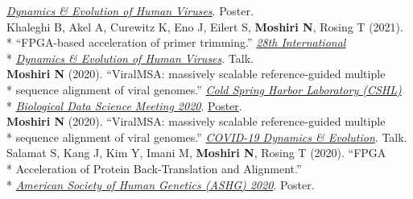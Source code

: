 \documentclass[margin,line]{res}
\begin{document}
\begin{resume}
\hspace*{8mm} \href{https://cpd.ucsd.edu/hivdynamics/}{\textit{Dynamics \& Evolution of Human Viruses}}. Poster.\\
\hspace*{4mm} Khaleghi B, Akel A, Curewitz K, Eno J, Eilert S, \textbf{Moshiri N}, Rosing T (2021).\\*
\hspace*{9mm} ``FPGA-based acceleration of primer trimming.'' \href{https://cpd.ucsd.edu/hivdynamics/}{\textit{28th International}}\\*\vspace{2mm}
\hspace*{8mm} \href{https://cpd.ucsd.edu/hivdynamics/}{\textit{Dynamics \& Evolution of Human Viruses}}. Talk.\\
\hspace*{4mm} \textbf{Moshiri N} (2020). ``ViralMSA: massively scalable reference-guided multiple\\*
\hspace*{9mm} sequence alignment of viral genomes.'' \href{http://meetings.cshl.edu/meetings.aspx?meet=DATA&year=20}{\textit{Cold Spring Harbor Laboratory (CSHL)}}\\*\vspace{2mm}
\hspace*{8mm} \href{http://meetings.cshl.edu/meetings.aspx?meet=DATA&year=18}{\textit{Biological Data Science Meeting 2020}}. \href{https://meetings.cshl.edu/posters/data20/data2020_AbstractBookVirtual.pdf}{Poster}.\\
\hspace*{4mm} \textbf{Moshiri N} (2020). ``ViralMSA: massively scalable reference-guided multiple\\*\vspace{2mm}
\hspace*{8mm} sequence alignment of viral genomes.'' \href{https://cpd.ucsd.edu/covid19/}{\textit{COVID-19 Dynamics \& Evolution}}. Talk.\\
\hspace*{4mm} Salamat S, Kang J, Kim Y, Imani M, \textbf{Moshiri N}, Rosing T (2020). ``FPGA\\*
\hspace*{9mm} Acceleration of Protein Back-Translation and Alignment.''\\*\vspace{2mm}
\hspace*{7mm} \href{https://www.ashg.org/meetings/2020meeting}{\textit{American Society of Human Genetics (ASHG) 2020}}. Poster.\\

\end{resume}
\end{document}
